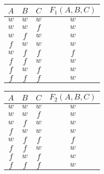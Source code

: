\documentclass[10pt, oneside]{article}
\begin{document}
\begin{table*}[h]
    \centering
    \begin{minipage}{.4\linewidth}
        \centering
        \begin{tabular}{|c|c|c|c|}
            \hline
            $A$ & $B$ & $C$ & $F_1(A, B, C)$ \\
            \hline
            $w$ & $w$ & $w$ & $w$ \\
            \hline
            $w$ & $w$ & $f$ & $w$ \\
            \hline
            $w$ & $f$ & $w$ & $w$ \\
            \hline
            $f$ & $w$ & $w$ & $w$ \\
            \hline
            $w$ & $f$ & $f$ & $f$ \\
            \hline
            $f$ & $f$ & $w$ & $w$ \\
            \hline
            $f$ & $w$ & $f$ & $w$ \\
            \hline
            $f$ & $f$ & $f$ & $w$ \\
            \hline
        \end{tabular}
    \end{minipage}%
    \begin{minipage}{.4\linewidth}
        \centering
        \begin{tabular}{|c|c|c|c|}
            \hline
            $A$ & $B$ & $C$ & $F_2(A, B, C)$ \\
            \hline
            $w$ & $w$ & $w$ & $w$ \\
            \hline
            $w$ & $w$ & $f$ & $w$ \\
            \hline
            $w$ & $f$ & $w$ & $w$ \\
            \hline
            $f$ & $w$ & $w$ & $w$ \\
            \hline
            $w$ & $f$ & $f$ & $f$ \\
            \hline
            $f$ & $f$ & $w$ & $w$ \\
            \hline
            $f$ & $w$ & $f$ & $w$ \\
            \hline
            $f$ & $f$ & $f$ & $w$ \\
            \hline
        \end{tabular}
    \end{minipage}  \\[15pt]
    \begin{minipage}{1\linewidth}
        \centering
        \begin{tabular}{|c|c|c|}

\end{tabular}
\end{minipage}
\end{table*}
\end{document}
